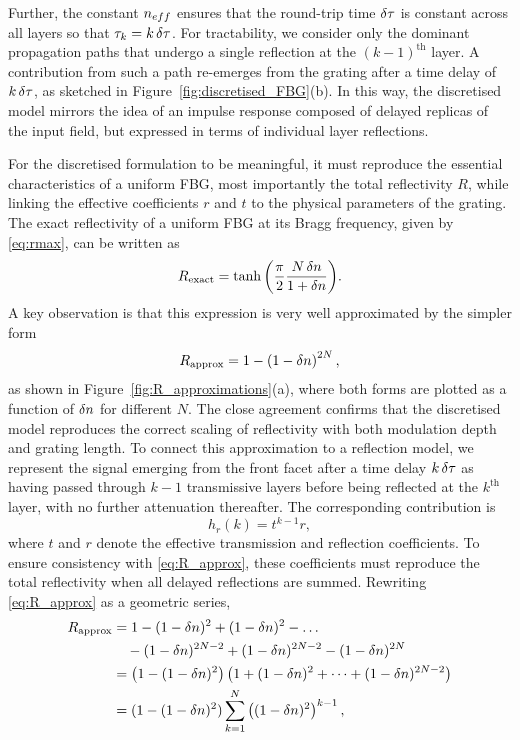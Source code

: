 Further, the constant $n_{eff}$ ensures that the round-trip time $\delta \tau$ is constant across all layers so that $\tau_k = k \, \delta \tau$. 
For tractability, we consider only the dominant propagation paths that undergo a single reflection at the $(k-1)^\text{th}$ layer. 
A contribution from such a path re-emerges from the grating after a time delay of $k\,\delta \tau$, as sketched in Figure~\ref{fig:discretised_FBG}(b). 
In this way, the discretised model mirrors the idea of an impulse response composed of delayed replicas of the input field, but expressed in terms of individual layer reflections.
%
\par
%
For the discretised formulation to be meaningful, it must reproduce the essential characteristics of a uniform FBG, most importantly the total reflectivity $R$, while linking the effective coefficients $r$ and $t$ to the physical parameters of the grating.
The exact reflectivity of a uniform FBG at its Bragg frequency, given by \eqref{eq:rmax}, can be written as
%
\begin{equation}
\label{eq:R_exact}
R_\text{exact} = \tanh{\left(\frac{\pi}{2}\frac{N \, \delta n}{1+\delta n} \right)}.
\end{equation}
%
A key observation is that this expression is very well approximated by the simpler form
%
\begin{equation}
\label{eq:R_approx}
R_\text{approx} = 1 - \left(1 - \delta n \right)^{2N},
\end{equation}
%
as shown in Figure~\ref{fig:R_approximations}(a), where both forms are plotted as a function of $\delta n$ for different $N$.
The close agreement confirms that the discretised model reproduces the correct scaling of reflectivity with both modulation depth and grating length.
To connect this approximation to a reflection model, we represent the signal emerging from the front facet after a time delay $k \, \delta \tau$ as having passed through $k-1$ transmissive layers before being reflected at the $k^\text{th}$ layer, with no further attenuation thereafter.
The corresponding contribution is
%
\begin{equation}
\label{eq:hr1}
h_r(k) = t^{k-1} r,
\end{equation}
%
where $t$ and $r$ denote the effective transmission and reflection coefficients.
To ensure consistency with \eqref{eq:R_approx}, these coefficients must reproduce the total reflectivity when all delayed reflections are summed.
Rewriting \eqref{eq:R_approx} as a geometric series,
%
\begin{align*}
R_\text{approx} &= 1 - (1-\delta n)^2 + (1-\delta n)^2 - \dots \\
&\hspace{1em} - (1-\delta n)^{2N-2} + (1-\delta n)^{2N-2} - (1-\delta n)^{2N} \\
&= \left( 1-(1-\delta n)^2 \right)\left( 1 + (1-\delta n)^2 + \dots + (1-\delta n)^{2N-2} \right) \\
&= (1-(1-\delta n)^2)\sum_{k=1}^{N} \left((1-\delta n)^2\right)^{k-1},
\end{align*}
